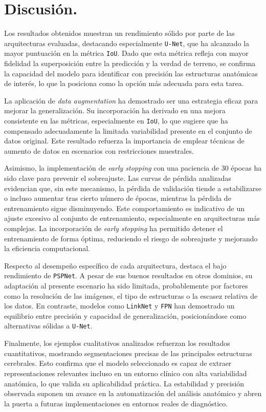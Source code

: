 \section{Discusión.}

Los resultados obtenidos muestran un rendimiento sólido por parte de las arquitecturas evaluadas, destacando especialmente \texttt{U-Net}, que ha alcanzado la mayor puntuación en la métrica \texttt{IoU}. Dado que esta métrica refleja con mayor fidelidad la superposición entre la predicción y la verdad de terreno, se confirma la capacidad del modelo para identificar con precisión las estructuras anatómicas de interés, lo que la posiciona como la opción más adecuada para esta tarea.

La aplicación de \textit{data augmentation} ha demostrado ser una estrategia eficaz para mejorar la generalización. Su incorporación ha derivado en una mejora consistente en las métricas, especialmente en \texttt{IoU}, lo que sugiere que ha compensado adecuadamente la limitada variabilidad presente en el conjunto de datos original. Este resultado refuerza la importancia de emplear técnicas de aumento de datos en escenarios con restricciones muestrales.

Asimismo, la implementación de \textit{early stopping} con una paciencia de 30 épocas ha sido clave para prevenir el sobreajuste. Las curvas de pérdida analizadas evidencian que, sin este mecanismo, la pérdida de validación tiende a estabilizarse o incluso aumentar tras cierto número de épocas, mientras la pérdida de entrenamiento sigue disminuyendo. Este comportamiento es indicativo de un ajuste excesivo al conjunto de entrenamiento, especialmente en arquitecturas más complejas. La incorporación de \textit{early stopping} ha permitido detener el entrenamiento de forma óptima, reduciendo el riesgo de sobreajuste y mejorando la eficiencia computacional.

Respecto al desempeño específico de cada arquitectura, destaca el bajo rendimiento de \texttt{PSPNet}. A pesar de sus buenos resultados en otros dominios, su adaptación al presente escenario ha sido limitada, probablemente por factores como la resolución de las imágenes, el tipo de estructuras o la escasez relativa de los datos. En contraste, modelos como \texttt{LinkNet} y \texttt{FPN} han demostrado un equilibrio entre precisión y capacidad de generalización, posicionándose como alternativas sólidas a \texttt{U-Net}.

Finalmente, los ejemplos cualitativos analizados refuerzan los resultados cuantitativos, mostrando segmentaciones precisas de las principales estructuras cerebrales. Esto confirma que el modelo seleccionado es capaz de extraer representaciones relevantes incluso en un entorno clínico con alta variabilidad anatómica, lo que valida su aplicabilidad práctica. La estabilidad y precisión observada suponen un avance en la automatización del análisis anatómico y abren la puerta a futuras implementaciones en entornos reales de diagnóstico.